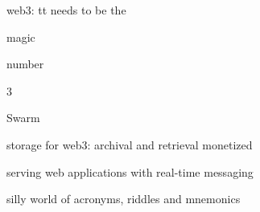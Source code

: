 \documentclass{beamer}
\begin{document}
\begin{frame}{web3: tt needs to be the}
\begin{block}{}
magic
\end{block}
\begin{block}{}
number
\end{block}
\begin{block}{}
3
\end{block}
\end{frame}

\begin{frame}{Swarm}
\begin{block}{}
storage for web3: archival and retrieval monetized
\end{block}
\begin{block}{}
serving web applications with real-time messaging
\end{block}
\begin{block}{}
silly world of acronyms, riddles and mnemonics
\end{block}
\end{frame}

\begin{frame}
 \tableofcontents[subsectionstyle=shaded/shaded,subsubsectionstyle=hide/hide]
\end{frame}
\end{document}
